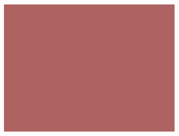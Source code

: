 \documentclass{article}
\begin{document}
\begin{figure}[H]
\begin{subfigure}[b]{0.32\textwidth}
    \end{subfigure}
    \begin{subfigure}[b]{0.32\textwidth}
        \centering
        \includegraphics[width=\linewidth]{rgb_184_h2.png} %
    \end{subfigure}
\end{figure}

\vspace{-1em}
\end{document}

